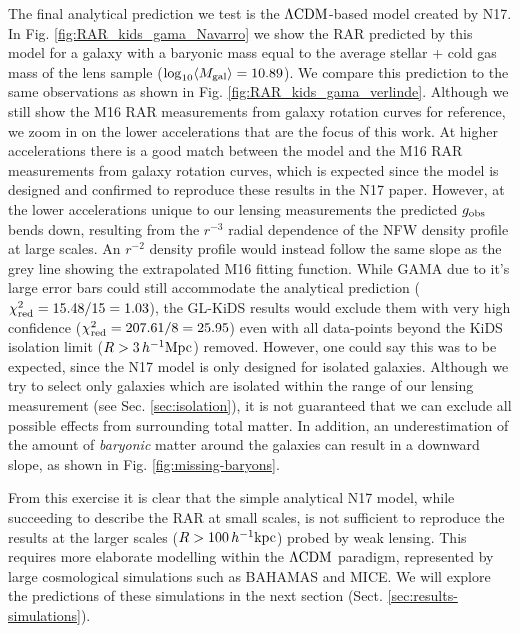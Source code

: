 \documentclass[usenatbib]{mnras}
\newcommand{\hkpc}{\, h^{-1}{\rm{kpc}} }
\newcommand{\hMpc}{\, h^{-1}{\rm{Mpc}} }
\newcommand{\lcdm}{{\rm \Lambda CDM}}
\newcommand*{\meanb}[1]{\langle{#1}\rangle}
\newcommand{\un}[1]{_{\rm #1}}
\begin{document}
The final analytical prediction we test is the $\lcdm$-based model created by N17. In Fig. \ref{fig:RAR_kids_gama_Navarro} we show the RAR predicted by this model for a galaxy with a baryonic mass equal to the average stellar + cold gas mass of the lens sample ($\log_{10}\meanb{M\un{gal}} = 10.89$). We compare this prediction to the same observations as shown in Fig. \ref{fig:RAR_kids_gama_verlinde}. Although we still show the M16 RAR measurements from galaxy rotation curves for reference, we zoom in on the lower accelerations that are the focus of this work. At higher accelerations there is a good match between the model and the M16 RAR measurements from galaxy rotation curves, which is expected since the model is designed and confirmed to reproduce these results in the N17 paper. However, at the lower accelerations unique to our lensing measurements the predicted $g\un{obs}$ bends down, resulting from the $r^{-3}$ radial dependence of the NFW density profile at large scales. An $r^{-2}$ density profile would instead follow the same slope as the grey line showing the extrapolated M16 fitting function. While GAMA due to it's large error bars could still accommodate the analytical prediction ($\chi\un{red}^2 = 15.48 / 15 = 1.03$), the GL-KiDS results would exclude them with very high confidence ($\chi\un{red}^2 = 207.61 / 8 = 25.95$) even with all data-points beyond the KiDS isolation limit ($R>3 \hMpc$) removed. However, one could say this was to be expected, since the N17 model is only designed for isolated galaxies. Although we try to select only galaxies which are isolated within the range of our lensing measurement (see Sec. \ref{sec:isolation}), it is not guaranteed that we can exclude all possible effects from surrounding total matter. In addition, an underestimation of the amount of \emph{baryonic} matter around the galaxies can result in a downward slope, as shown in Fig. \ref{fig:missing-baryons}.

From this exercise it is clear that the simple analytical N17 model, while succeeding to describe the RAR at small scales, is not sufficient to reproduce the results at the larger scales ($R > 100 \hkpc$) probed by weak lensing. This requires more elaborate modelling within the $\lcdm$ paradigm, represented by large cosmological simulations such as BAHAMAS and MICE. We will explore the predictions of these simulations in the next section (Sect. \ref{sec:results-simulations}).

\end{document}
